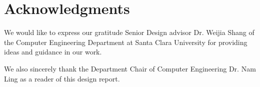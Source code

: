 \chapter*{Acknowledgments}
We would like to express our gratitude Senior Design advisor Dr. Weijia Shang of the Computer Engineering Department at Santa Clara University for providing ideas and guidance in our work.

We also sincerely thank the Department Chair of Computer Engineering Dr. Nam Ling as a reader of this design report.